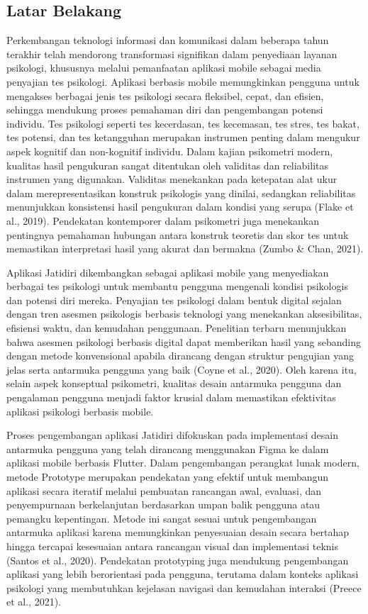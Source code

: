 \subsection{Latar Belakang}

Perkembangan teknologi informasi dan komunikasi dalam beberapa tahun terakhir telah mendorong transformasi signifikan dalam penyediaan layanan psikologi, khususnya melalui pemanfaatan aplikasi mobile sebagai media penyajian tes psikologi. Aplikasi berbasis mobile memungkinkan pengguna untuk mengakses berbagai jenis tes psikologi secara fleksibel, cepat, dan efisien, sehingga mendukung proses pemahaman diri dan pengembangan potensi individu. Tes psikologi seperti tes kecerdasan, tes kecemasan, tes stres, tes bakat, tes potensi, dan tes ketangguhan merupakan instrumen penting dalam mengukur aspek kognitif dan non-kognitif individu. Dalam kajian psikometri modern, kualitas hasil pengukuran sangat ditentukan oleh validitas dan reliabilitas instrumen yang digunakan. Validitas menekankan pada ketepatan alat ukur dalam merepresentasikan konstruk psikologis yang dinilai, sedangkan reliabilitas menunjukkan konsistensi hasil pengukuran dalam kondisi yang serupa (Flake et al., 2019). Pendekatan kontemporer dalam psikometri juga menekankan pentingnya pemahaman hubungan antara konstruk teoretis dan skor tes untuk memastikan interpretasi hasil yang akurat dan bermakna (Zumbo \& Chan, 2021).

Aplikasi Jatidiri dikembangkan sebagai aplikasi mobile yang menyediakan berbagai tes psikologi untuk membantu pengguna mengenali kondisi psikologis dan potensi diri mereka. Penyajian tes psikologi dalam bentuk digital sejalan dengan tren asesmen psikologis berbasis teknologi yang menekankan aksesibilitas, efisiensi waktu, dan kemudahan penggunaan. Penelitian terbaru menunjukkan bahwa asesmen psikologi berbasis digital dapat memberikan hasil yang sebanding dengan metode konvensional apabila dirancang dengan struktur pengujian yang jelas serta antarmuka pengguna yang baik (Coyne et al., 2020). Oleh karena itu, selain aspek konseptual psikometri, kualitas desain antarmuka pengguna dan pengalaman pengguna menjadi faktor krusial dalam memastikan efektivitas aplikasi psikologi berbasis mobile.

Proses pengembangan aplikasi Jatidiri difokuskan pada implementasi desain antarmuka pengguna yang telah dirancang menggunakan Figma ke dalam aplikasi mobile berbasis Flutter. Dalam pengembangan perangkat lunak modern, metode Prototype merupakan pendekatan yang efektif untuk membangun aplikasi secara iteratif melalui pembuatan rancangan awal, evaluasi, dan penyempurnaan berkelanjutan berdasarkan umpan balik pengguna atau pemangku kepentingan. Metode ini sangat sesuai untuk pengembangan antarmuka aplikasi karena memungkinkan penyesuaian desain secara bertahap hingga tercapai kesesuaian antara rancangan visual dan implementasi teknis (Santos et al., 2020). Pendekatan prototyping juga mendukung pengembangan aplikasi yang lebih berorientasi pada pengguna, terutama dalam konteks aplikasi psikologi yang membutuhkan kejelasan navigasi dan kemudahan interaksi (Preece et al., 2021).

